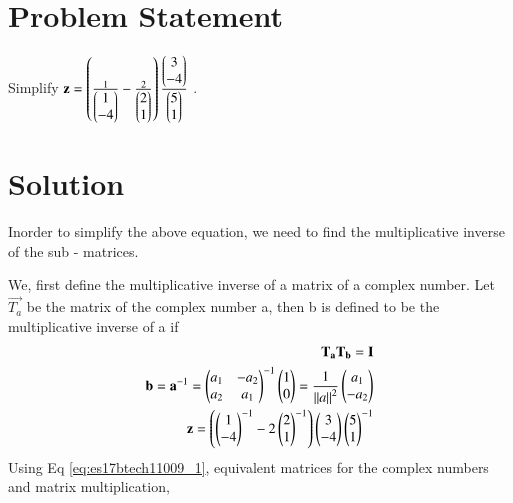 \documentclass[journal,12pt,twocolumn]{IEEEtran}
\begin{document}
\section{\textbf{Problem Statement}}

Simplify $\mathbf{z} = \left(\frac{1}{\begin{pmatrix} 1 \\ -4 \end{pmatrix}} - \frac{2}{\begin{pmatrix} 2 \\ 1\end{pmatrix}}\right) \frac{\begin{pmatrix} 3 \\ -4 \end{pmatrix}}{\begin{pmatrix} 5 \\ 1 \end{pmatrix}}$ .
%
\section{\textbf{Solution}}
Inorder to simplify the above equation, we need to find the multiplicative inverse of the sub - matrices.

We, first define the multiplicative inverse of a matrix of a complex number.
Let $\vec{T_a}$ be the matrix of the complex number a, then b is defined to be the multiplicative inverse of a if
\begin{align}
    \mathbf{T_a}\mathbf{T_b} = \mathbf{I}\\ 
    \mathbf{b} = \mathbf{a}^{-1} = \begin{pmatrix}a_1 & -a_2 \\ a_2 & a_1\end{pmatrix}^{-1} \begin{pmatrix}1 \\ 0\end{pmatrix}
     = \frac{1}{\left\| a\right\|^2}\begin{pmatrix}a_1 \\ -a_2\end{pmatrix}\label{eq:es17btech11009_1}\\
      \mathbf{z} = \left(\begin{pmatrix}1 \\ -4\end{pmatrix}^{-1} - 2\begin{pmatrix}2 \\ 1\end{pmatrix}^{-1}\right) \begin{pmatrix}3 \\ -4\end{pmatrix} \begin{pmatrix}5 \\ 1\end{pmatrix}^{-1}
\end{align}
Using Eq \eqref{eq:es17btech11009_1}, equivalent matrices for the complex numbers and matrix multiplication,
\end{document}
